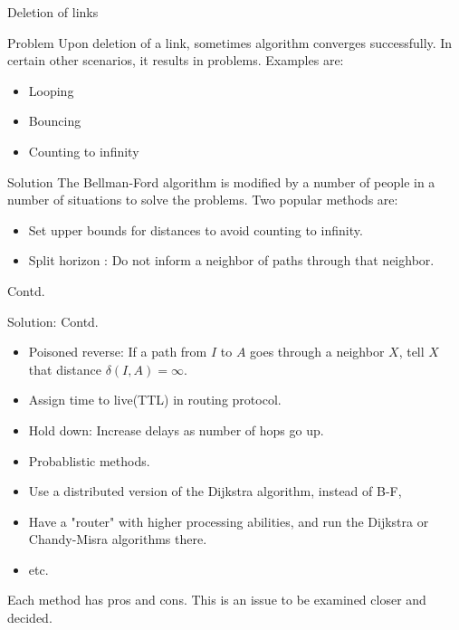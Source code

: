 \begin{frame}{Deletion of links}
\begin{block}{Problem}
Upon deletion of a link, sometimes algorithm converges successfully. In certain other scenarios, it results in problems. 
Examples are:
\begin{itemize}
\item Looping
\item Bouncing
\item Counting to infinity
\end{itemize}
\end{block}

\begin{block}{Solution}
The Bellman-Ford algorithm is modified by a number of people in a number of situations to solve the problems. Two popular methods are:
\begin{itemize}
\item Set upper bounds for distances to avoid counting to infinity.
\item Split horizon : Do not inform a neighbor of paths through that neighbor.
\end{itemize}
\end{block}
\end{frame}

\begin{frame}{Contd.}
\begin{block}{Solution: Contd.}
\begin{itemize}
\item Poisoned reverse: If a path from $I$ to $A$ goes through a neighbor $X$, tell $X$ that distance $\delta (I,A) = \infty$.
\item Assign time to live(TTL) in routing protocol.
\item Hold down: Increase delays as number of hops go up.
\item Probablistic methods.
\item Use a distributed version of the Dijkstra algorithm, instead of B-F,
\item Have a "router" with higher processing abilities, and run the Dijkstra or Chandy-Misra algorithms there.
\item etc.
\end{itemize}
\end{block}
Each method has pros and cons. This is an issue to be examined closer and decided.
\end{frame}


